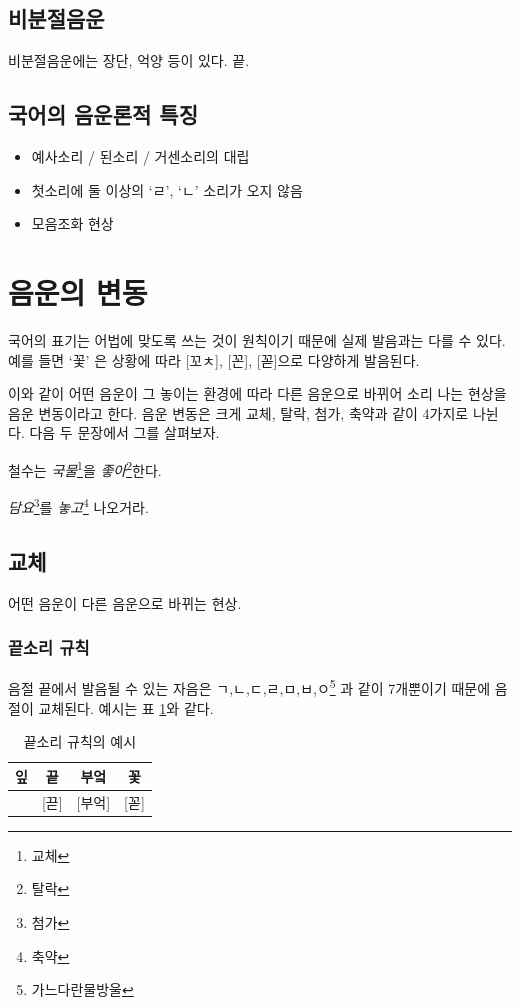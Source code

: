 \documentclass[10pt]{report}
\begin{document}
\subsection{비분절음운}
비분절음운에는 장단, 억양 등이 있다. 끝.

\subsection{국어의 음운론적 특징}
\begin{itemize}
\item 예사소리 / 된소리 / 거센소리의 대립
\item 첫소리에 둘 이상의 `ㄹ', `ㄴ' 소리가 오지 않음
\item 모음조화 현상
\end{itemize}

\section{음운의 변동}
국어의 표기는 어법에 맞도록 쓰는 것이 원칙이기 때문에 실제 발음과는 다를 수 있다. 예를 들면 `꽃' 은 상황에 따라 [꼬ㅊ], [꼰], [꼳]으로 다양하게 발음된다.

이와 같이 어떤 음운이 그 놓이는 환경에 따라 다른 음운으로 바뀌어 소리 나는 현상을 음운 변동이라고 한다. 음운 변동은 크게 교체, 탈락, 첨가, 축약과 같이 4가지로 나뉜다. 다음 두 문장에서 그를 살펴보자.

\begin{center}
	철수는 \textit{국물}\footnote{교체}을 \textit{좋아}\footnote{탈락}한다.
	
	\textit{담요}\footnote{첨가}를 \textit{놓고}\footnote{축약} 나오거라.
\end{center}

\subsection{교체}
어떤 음운이 다른 음운으로 바뀌는 현상.
\subsubsection{끝소리 규칙}
음절 끝에서 발음될 수 있는 자음은 ㄱ,ㄴ,ㄷ,ㄹ,ㅁ,ㅂ,ㅇ\footnote{가느다란물방울} 과 같이 7개뿐이기 때문에 음절이 교체된다. 예시는 표 \ref{end_sound_rule}와 같다.

\begin{table}
\begin{center}
	\begin{tabular}{|c|c|c|c|}
		\hline
		잎 & 끝 & 부엌 & 꽃 \\
		\hline
		[입] & [끋] & [부억] & [꼳] \\
		\hline
	\end{tabular}
	\caption{끝소리 규칙의 예시}
	\label{end_sound_rule}
\end{center}
\end{table}
\end{document}
